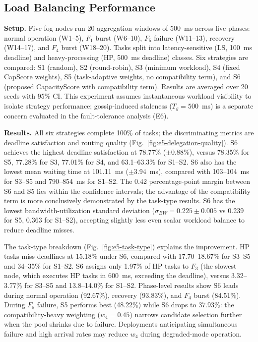 \documentclass[conference]{IEEEtran}
\begin{document}
    \subsection{Load Balancing Performance}
    \label{sec:eval-lb}

    \textbf{Setup.} Five fog nodes run 20 aggregation windows of 500~ms across five phases: normal operation (W1--5), $F_1$ burst (W6--10), $F_5$ failure (W11--13), recovery (W14--17), and $F_4$ burst (W18--20). Tasks split into latency-sensitive (LS, 100~ms deadline) and heavy-processing (HP, 500~ms deadline) classes. Six strategies are compared: S1 (random), S2 (round-robin), S3 (minimum workload), S4 (fixed CapScore weights), S5 (task-adaptive weights, no compatibility term), and S6 (proposed CapacityScore with compatibility term). Results are averaged over 20 seeds with 95\% CI. This experiment assumes instantaneous workload visibility to isolate strategy performance; gossip-induced staleness ($T_g = 500$~ms) is a separate concern evaluated in the fault-tolerance analysis (E6).

    \textbf{Results.} All six strategies complete 100\% of tasks; the discriminating metrics are deadline satisfaction and routing quality (Fig.~\ref{fig:e5-delegation-quality}). S6 achieves the highest deadline satisfaction at 78.77\% ($\pm$0.88\%), versus 78.35\% for S5, 77.28\% for S3, 77.01\% for S4, and 63.1--63.3\% for S1--S2. S6 also has the lowest mean waiting time at 101.11~ms ($\pm$3.94~ms), compared with 103--104~ms for S3--S5 and 790--854~ms for S1--S2. The 0.42 percentage-point margin between S6 and S5 lies within the confidence intervals; the advantage of the compatibility term is more conclusively demonstrated by the task-type results. S6 has the lowest bandwidth-utilization standard deviation ($\sigma_{BW}=0.225\pm0.005$ vs 0.239 for S5, 0.363 for S1--S2), accepting slightly less even scalar workload balance to reduce deadline misses.

    The task-type breakdown (Fig.~\ref{fig:e5-task-type}) explains the improvement. HP tasks miss deadlines at 15.18\% under S6, compared with 17.70--18.67\% for S3--S5 and 34--35\% for S1--S2. S6 assigns only 1.97\% of HP tasks to $F_3$ (the slowest node, which executes HP tasks in 600~ms, exceeding the deadline), versus 3.32--3.77\% for S3--S5 and 13.8--14.0\% for S1--S2. Phase-level results show S6 leads during normal operation (92.67\%), recovery (93.83\%), and $F_4$ burst (84.51\%). During $F_5$ failure, S5 performs best (48.22\%) while S6 drops to 37.93\%: the compatibility-heavy weighting ($w_4=0.45$) narrows candidate selection further when the pool shrinks due to failure. Deployments anticipating simultaneous failure and high arrival rates may reduce $w_4$ during degraded-mode operation.
\end{document}
